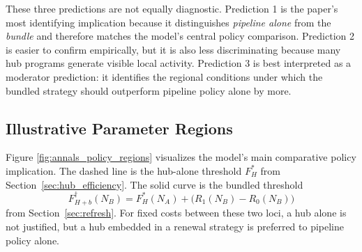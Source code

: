 These three predictions are not equally diagnostic. Prediction 1 is the paper's most identifying implication because it distinguishes \emph{pipeline alone} from the \emph{bundle} and therefore matches the model's central policy comparison. Prediction 2 is easier to confirm empirically, but it is also less discriminating because many hub programs generate visible local activity. Prediction 3 is best interpreted as a moderator prediction: it identifies the regional conditions under which the bundled strategy should outperform pipeline policy alone by more.

\subsection{Illustrative Parameter Regions}

Figure \ref{fig:annals_policy_regions} visualizes the model's main comparative policy implication. The dashed line is the hub-alone threshold $F_H^*$ from Section~\ref{sec:hub_efficiency}. The solid curve is the bundled threshold
\[
F_{H+b}^{\dagger}(N_B)=F_H^*(N_A)+\bigl(R_1(N_B)-R_0(N_B)\bigr)
\]
from Section~\ref{sec:refresh}. For fixed costs between these two loci, a hub alone is not justified, but a hub embedded in a renewal strategy is preferred to pipeline policy alone.

